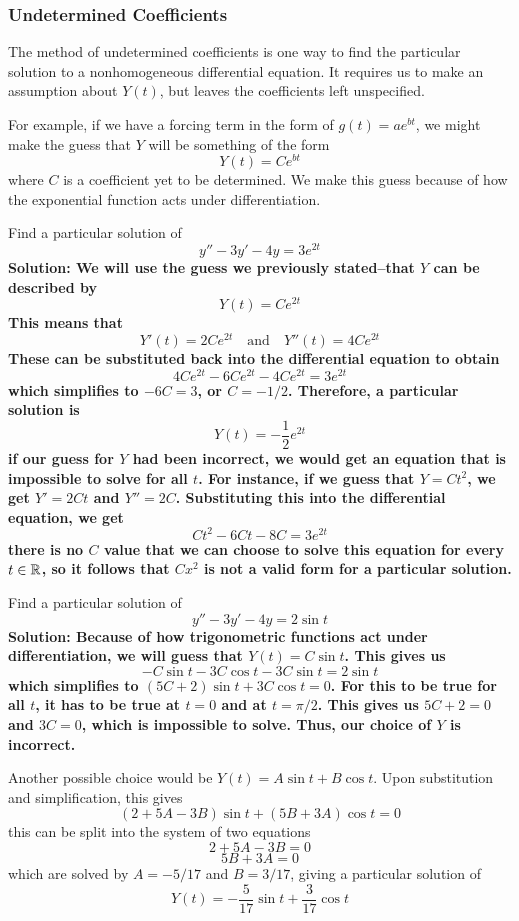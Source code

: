 \subsubsection{Undetermined Coefficients}
The method of undetermined coefficients is one way to find the particular solution to a nonhomogeneous differential equation. It requires us to make an assumption about $Y(t)$, but leaves the coefficients left unspecified. \par
For example, if we have a forcing term in the form of $g(t) = ae^{bt}$, we might make the guess that $Y$ will be something of the form
\[ Y(t) = Ce^{bt} \]
where $C$ is a coefficient yet to be determined. We make this guess because of how the exponential function acts under differentiation. 
\begin{example}
    Find a particular solution of
    \[ y'' - 3y' - 4y = 3e^{2t} \]
    \bf{Solution:} We will use the guess we previously stated--that $Y$ can be described by 
    \[ Y(t) = Ce^{2t} \]
    This means that
    \[ Y'(t) = 2Ce^{2t} \quad \text{and}\quad Y''(t) = 4Ce^{2t} \]
    These can be substituted back into the differential equation to obtain
    \[ 4Ce^{2t} - 6Ce^{2t} - 4Ce^{2t} = 3e^{2t} \]
    which simplifies to $-6C = 3$, or $C = -1/2$. Therefore, a particular solution is
    \[ Y(t) = -\frac{1}{2}e^{2t} \]
    if our guess for $Y$ had been incorrect, we would get an equation that is impossible to solve for all $t$. For instance, if we guess that $Y = Ct^2$, we get $Y' = 2Ct$ and $Y'' = 2C$. Substituting this into the differential equation, we get
    \[ Ct^2 - 6Ct - 8C = 3e^{2t} \]
    there is no $C$ value that we can choose to solve this equation for every $t\in \mathbb{R}$, so it follows that $Cx^2$ is not a valid form for a particular solution.
\end{example}
\begin{example}
    Find a particular solution of
    \[ y'' - 3y' - 4y = 2\sin t\]
    \bf{Solution:} Because of how trigonometric functions act under differentiation, we will guess that $Y(t) = C\sin t$. This gives us
    \[ -C\sin t - 3C\cos t - 3C\sin t = 2\sin t\]
    which simplifies to $(5C+2)\sin t + 3C\cos t = 0$. For this to be true for all $t$, it has to be true at  $t=0$ and at $t=\pi/2$. This gives us $5C+2=0$ and $3C = 0$, which is impossible to solve. Thus, our choice of $Y$ is incorrect. \par
    Another possible choice would be $Y(t) = A\sin t + B\cos t$. Upon substitution and simplification, this gives
    \[ (2 + 5A - 3B)\sin t + (5B + 3A)\cos t = 0\]
    this can be split into the system of two equations
    \[ 2 + 5A - 3B = 0 \]
    \[ 5B + 3A = 0 \]
    which are solved by $A = -5/17$ and $B = 3/17$, giving a particular solution of
    \[ Y(t) = -\frac{5}{17}\sin t + \frac{3}{17}\cos t \]
\end{example}
